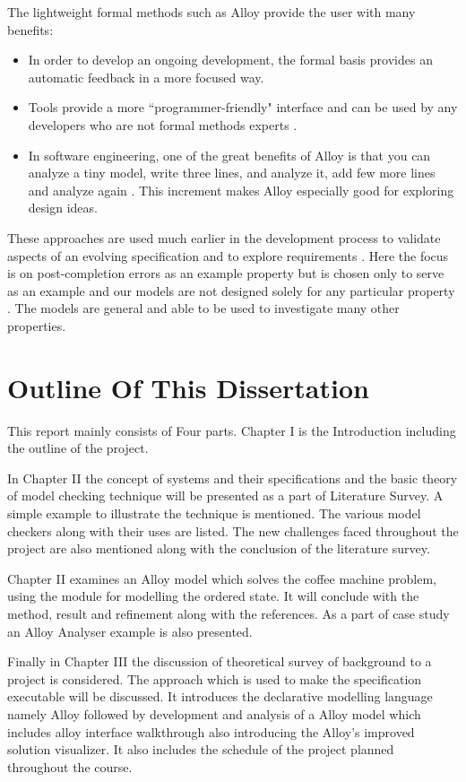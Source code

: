 \documentclass[a4paper,10pt]{report}
\begin{document}
The lightweight formal methods such as Alloy provide the user with many benefits:
\begin{itemize}
\item {In order to develop an ongoing development, the formal basis provides an automatic feedback in a more focused way.}
\item {Tools provide a more ``programmer-friendly" interface and can be used by any developers who are not formal methods experts} \cite{Boyatt}.
\item {In software engineering, one of the great benefits of Alloy is that you can analyze a tiny model, write three lines, and analyze it, add few more lines and analyze again \cite{ErichGamma1995}. This increment makes Alloy especially good for exploring design ideas. }
\end{itemize}
These approaches are used much earlier in the development process to validate aspects of an evolving specification and to explore requirements \cite{Hoare1986}. Here the focus is on post-completion errors as an example property but is chosen only to serve as an example and our models are not designed solely for any particular property \cite{ErichGamma1995}. The models are general and able to be used to investigate many other properties.
 
\section{Outline Of This Dissertation}
\label{Outline dissert}

This report mainly consists of Four parts. Chapter I is the Introduction including the outline of the project.

In Chapter II the concept of systems and their specifications and the basic theory of model checking technique will be presented as a part of Literature Survey. A simple example to illustrate the technique is mentioned. The various model checkers along with their uses are listed. The new challenges faced throughout the project are also mentioned along with the conclusion of the literature survey.

Chapter II examines an Alloy model which solves the coffee machine problem, using the module for modelling the ordered state. It will conclude with the method, result and refinement along with the references. As a part of case study an Alloy Analyser example is also presented.

Finally in Chapter III the discussion of theoretical survey of background to a project is considered. The approach which is used to make the specification executable will be discussed. It introduces the declarative modelling language namely Alloy followed by development and analysis of a Alloy model which includes alloy interface walkthrough also introducing the Alloy's improved solution visualizer. It also includes the schedule of the project planned throughout the course.
\end{document}
